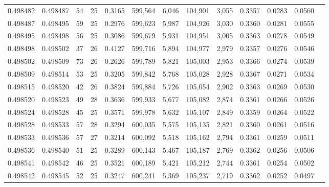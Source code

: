 \begin{tabular}{rrrrrrrrrrrrr}
0.498482 & 0.498487 &  54 &  25 &                                     0.3165 & 599,564 &   6,046 & 104,901 &   3,055 & 0.3357 & 0.0283 & 0.0560 \\
0.498487 & 0.498495 &  59 &  25 &                                     0.2976 & 599,623 &   5,987 & 104,926 &   3,030 & 0.3360 & 0.0281 & 0.0555 \\
0.498495 & 0.498498 &  56 &  25 &                                     0.3086 & 599,679 &   5,931 & 104,951 &   3,005 & 0.3363 & 0.0278 & 0.0549 \\
0.498498 & 0.498502 &  37 &  26 &                                     0.4127 & 599,716 &   5,894 & 104,977 &   2,979 & 0.3357 & 0.0276 & 0.0546 \\
0.498502 & 0.498509 &  73 &  26 &                                     0.2626 & 599,789 &   5,821 & 105,003 &   2,953 & 0.3366 & 0.0274 & 0.0539 \\
0.498509 & 0.498514 &  53 &  25 &                                     0.3205 & 599,842 &   5,768 & 105,028 &   2,928 & 0.3367 & 0.0271 & 0.0534 \\
0.498515 & 0.498520 &  42 &  26 &                                     0.3824 & 599,884 &   5,726 & 105,054 &   2,902 & 0.3363 & 0.0269 & 0.0530 \\
0.498520 & 0.498523 &  49 &  28 &                                     0.3636 & 599,933 &   5,677 & 105,082 &   2,874 & 0.3361 & 0.0266 & 0.0526 \\
0.498524 & 0.498528 &  45 &  25 &                                     0.3571 & 599,978 &   5,632 & 105,107 &   2,849 & 0.3359 & 0.0264 & 0.0522 \\
0.498528 & 0.498533 &  57 &  28 &                                     0.3294 & 600,035 &   5,575 & 105,135 &   2,821 & 0.3360 & 0.0261 & 0.0516 \\
0.498533 & 0.498536 &  57 &  27 &                                     0.3214 & 600,092 &   5,518 & 105,162 &   2,794 & 0.3361 & 0.0259 & 0.0511 \\
0.498536 & 0.498540 &  51 &  25 &                                     0.3289 & 600,143 &   5,467 & 105,187 &   2,769 & 0.3362 & 0.0256 & 0.0506 \\
0.498541 & 0.498542 &  46 &  25 &                                     0.3521 & 600,189 &   5,421 & 105,212 &   2,744 & 0.3361 & 0.0254 & 0.0502 \\
0.498542 & 0.498545 &  52 &  25 &                                     0.3247 & 600,241 &   5,369 & 105,237 &   2,719 & 0.3362 & 0.0252 & 0.0497 \\

\end{tabular}
